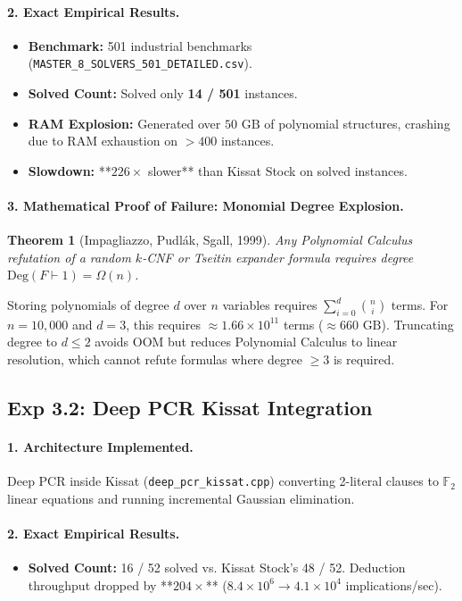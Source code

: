 \documentclass[11pt]{article}
\newtheorem{theorem}{Theorem}
\theoremstyle{definition}
\begin{document}
\paragraph{2. Exact Empirical Results.}
\begin{itemize}
    \item \textbf{Benchmark:} 501 industrial benchmarks (\texttt{MASTER_8_SOLVERS_501_DETAILED.csv}).
    \item \textbf{Solved Count:} Solved only \textbf{14 / 501} instances.
    \item \textbf{RAM Explosion:} Generated over \textbf{$50\text{ GB}$} of polynomial structures, crashing due to RAM exhaustion on $>400$ instances.
    \item \textbf{Slowdown:} **$226\times$ slower** than Kissat Stock on solved instances.
\end{itemize}

\paragraph{3. Mathematical Proof of Failure: Monomial Degree Explosion.}
\begin{theorem}[Impagliazzo, Pudlák, Sgall, 1999]
Any Polynomial Calculus refutation of a random $k$-CNF or Tseitin expander formula requires degree $\text{Deg}(F \vdash 1) = \Omega(n)$.
\end{theorem}
Storing polynomials of degree $d$ over $n$ variables requires $\sum_{i=0}^d \binom{n}{i}$ terms. For $n = 10,000$ and $d=3$, this requires $\approx 1.66 \times 10^{11}$ terms ($\approx 660\text{ GB}$). Truncating degree to $d \le 2$ avoids OOM but reduces Polynomial Calculus to linear resolution, which cannot refute formulas where degree $\ge 3$ is required.

\subsection{Exp 3.2: Deep PCR Kissat Integration}
\paragraph{1. Architecture Implemented.}
Deep PCR inside Kissat (\texttt{deep_pcr_kissat.cpp}) converting 2-literal clauses to $\mathbb{F}_2$ linear equations and running incremental Gaussian elimination.

\paragraph{2. Exact Empirical Results.}
\begin{itemize}
    \item \textbf{Solved Count:} 16 / 52 solved vs. Kissat Stock’s 48 / 52. Deduction throughput dropped by **$204\times$** ($8.4 \times 10^6 \to 4.1 \times 10^4$ implications/sec).
\end{itemize}
\end{document}
